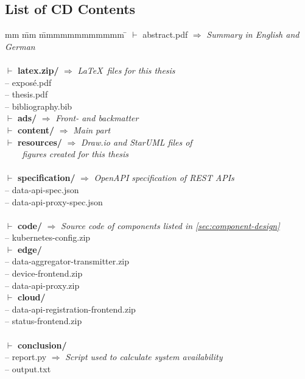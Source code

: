 \begin{appendices}

\FloatBarrier


\chapter{List of CD Contents}
\label{app:cd-contents}

\begin{tabbing}
	mm \= mm \= mmmmmmmmmmmm \= \kill
	$\vdash$ abstract.pdf 						\> \> \> $\Rightarrow$ \textit{Summary in English and German} \\
	\\
	$\vdash$ \textbf{latex.zip/} 				\> \> \> $\Rightarrow$ \textit{\LaTeX~files for this thesis} \\
	\> -- exposé.pdf \\
	\> -- thesis.pdf \\
	\> -- bibliography.bib \\
	\> $\vdash$ \textbf{ads/}   			\> \> $\Rightarrow$ \textit{Front- and backmatter} \\
	\> $\vdash$ \textbf{content/}   		\> \> $\Rightarrow$ \textit{Main part} \\
	\> $\vdash$ \textbf{resources/}   		\> \> $\Rightarrow$ \textit{Draw.io and StarUML files of} \\
											\> \> \> 			\textit{~~~~figures created for this thesis} \\
	\\
	$\vdash$ \textbf{specification/} 		\> \> \> $\Rightarrow$ \textit{OpenAPI specification of \acs{REST} \acsp{API}} \\
	\> -- data-api-spec.json \\
	\> -- data-api-proxy-spec.json \\
	\\
	$\vdash$ \textbf{code/} 				\> \> \> $\Rightarrow$ \textit{Source code of components listed in \autoref{sec:component-design}} \\
	\> -- kubernetes-config.zip \\
	\> $\vdash$ \textbf{edge/} \\
	\> \> -- data-aggregator-transmitter.zip \\
	\> \> -- device-frontend.zip \\
	\> \> -- data-api-proxy.zip \\
	\> $\vdash$ \textbf{cloud/} \\
	\> \> -- data-api-registration-frontend.zip \\
	\> \> -- status-frontend.zip \\
	\\
	$\vdash$ \textbf{conclusion/} \\ 			
	\> -- report.py 						\> \> $\Rightarrow$ \textit{Script used to calculate system availability} \\
	\> -- output.txt \\
\end{tabbing}

\end{appendices}
